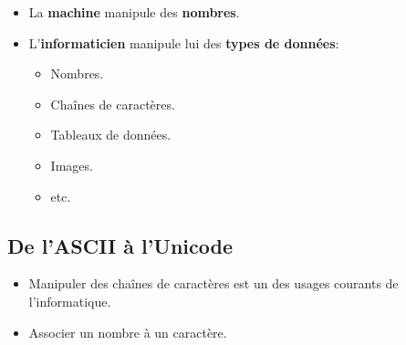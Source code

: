 \begin{slide}
  \begin{itemize}
    \item La \textbf{machine} manipule des \textbf{nombres}.
    \item L'\textbf{informaticien} manipule lui des \textbf{types de données}:
      \begin{itemize}
	\item Nombres.
	\item Chaînes de caractères.
	\item Tableaux de données.
	\item Images.
	\item etc. 
      \end{itemize}
  \end{itemize}
\end{slide}

\subsection{De l'ASCII à l'Unicode}
\begin{slide}
  \begin{itemize}
    \item Manipuler des chaînes de caractères est un des usages courants de l'informatique.
    \item Associer un nombre à un caractère.
  \end{itemize}
\end{slide}

